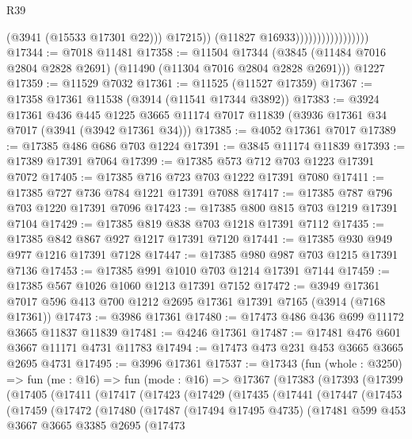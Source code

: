 \begin{lexlean}{R39}
\begin{coremodule}
                                          (@3941 (@15533 @17301 @22)))
                                        @17215))
                                    (@11827 @16933)))))))))))))))))
@17344 := @7018 @11481
@17358 := @11504
    @17344
    (@3845 (@11484 @7016 @2804 @2828 @2691) (@11490 (@11304 @7016 @2804 @2828 @2691)))
    @1227
@17359 := @11529 @7032
@17361 := @11525 (@11527 @17359)
@17367 := @17358 @17361 @11538 (@3914 (@11541 @17344 @3892))
@17383 := @3924
    @17361
    @436
    @445
    @1225
    @3665
    @11174
    @7017
    @11839
    (@3936 @17361 @34 @7017 (@3941 (@3942 @17361 @34)))
@17385 := @4052 @17361 @7017
@17389 := @17385 @486 @686 @703 @1224
@17391 := @3845 @11174 @11839
@17393 := @17389 @17391 @7064
@17399 := @17385 @573 @712 @703 @1223 @17391 @7072
@17405 := @17385 @716 @723 @703 @1222 @17391 @7080
@17411 := @17385 @727 @736 @784 @1221 @17391 @7088
@17417 := @17385 @787 @796 @703 @1220 @17391 @7096
@17423 := @17385 @800 @815 @703 @1219 @17391 @7104
@17429 := @17385 @819 @838 @703 @1218 @17391 @7112
@17435 := @17385 @842 @867 @927 @1217 @17391 @7120
@17441 := @17385 @930 @949 @977 @1216 @17391 @7128
@17447 := @17385 @980 @987 @703 @1215 @17391 @7136
@17453 := @17385 @991 @1010 @703 @1214 @17391 @7144
@17459 := @17385 @567 @1026 @1060 @1213 @17391 @7152
@17472 := @3949 @17361 @7017 @596 @413 @700 @1212 @2695 @17361 @17391 @7165 (@3914 (@7168 @17361))
@17473 := @3986 @17361
@17480 := @17473 @486 @436 @699 @11172 @3665 @11837 @11839
@17481 := @4246 @17361
@17487 := @17481 @476 @601 @3667 @11171 @4731 @11783
@17494 := @17473 @473 @231 @453 @3665 @3665 @2695 @4731
@17495 := @3996 @17361
@17537 := @17343
    (fun (whole : @3250) =>
    fun (me : @16) =>
    fun (mode : @16) =>
    @17367
      (@17383
        (@17393
          (@17399
            (@17405
              (@17411
                (@17417
                  (@17423
                    (@17429
                      (@17435
                        (@17441
                          (@17447
                            (@17453
                              (@17459
                                (@17472
                                  (@17480
                                    (@17487
                                      (@17494 @17495 @4735)
                                      (@17481
                                        @599
                                        @453
                                        @3667
                                        @3665
                                        @3385
                                        @2695
                                        (@17473

\end{coremodule}
\end{lexlean}
